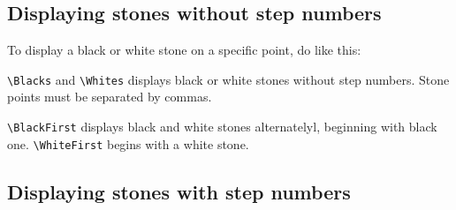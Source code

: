 \documentclass[a4paper]{oblivoir}
\begin{document}
\subsection{Displaying stones without step numbers}

To display a black or white stone on a specific point, do like this:
\begin{boxedverbatim}
 
\end{boxedverbatim}

\begin{ksbadukpan}[badukpansize=7,badukpancolor=yellow!20][DL]
 
\end{ksbadukpan}

\begin{boxedverbatim}
 
\end{boxedverbatim}

\begin{ksbadukpan}[badukpansize=7,badukpancolor=yellow!20][DL]
\end{ksbadukpan}
\quad
\begin{ksbadukpan}[badukpansize=7,badukpancolor=yellow!20][DL]
\end{ksbadukpan}

\verb|\Blacks| and \verb|\Whites| displays black or white stones without step numbers. 
Stone points must be separated by commas.

\begin{boxedverbatim}
 
\end{boxedverbatim}

\begin{ksbadukpan}[badukpansize=7,badukpancolor=yellow!20][DL]
\end{ksbadukpan}
\quad
\begin{ksbadukpan}[badukpansize=7,badukpancolor=yellow!20][DL]
\end{ksbadukpan}

\verb|\BlackFirst| displays black and white stones alternatelyl, beginning with black one.
\verb|\WhiteFirst| begins with a white stone.

\subsection{%
Displaying stones with step numbers}
\end{document}
